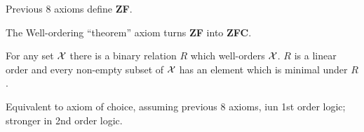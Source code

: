 \label{sec:Well_ordering_theorem}

Previous 8 axioms define \textbf{ZF}.

The Well-ordering ``theorem'' axiom turns \textbf{ZF}
into \textbf{ZFC}\cite{wiki:Well_ordering_theorem}.

For any set $\mathcal{X}$ there is a binary relation $R$ which
 well-orders $\mathcal{X}$.
 $R$ is a linear order and every non-empty subset of $\mathcal{X}$
 has an element which is minimal under $R$.

Equivalent to axiom of choice\cite{wiki:Axiom_of_choice}, 
assuming previous 8 axioms, iun 1st order logic;
stronger in 2nd order logic.

\setcounter{currentlevel}{\value{baseSectionLevel}}


\setcounter{currentlevel}{\value{baseSectionLevel}}




\cite{Briggs:2006,Briggs:XRC:2013}


\cite{Briggs:2006,Briggs:XRC:2013}


\cite{Burnikel:1996,Burnikel:1999,Mehlhorn:1995,LEDA:2009}




\cite{Karamcheti:1999}



